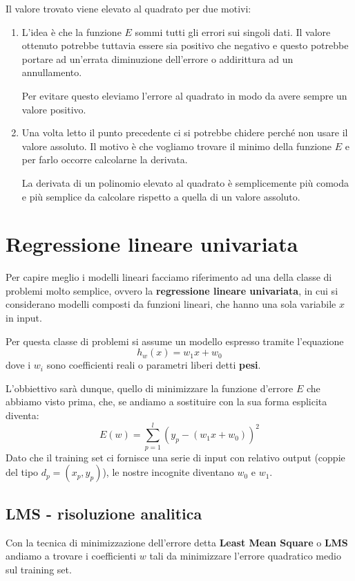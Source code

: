 Il valore trovato viene elevato al quadrato per due motivi:
\begin{enumerate}
	\item L'idea \`e che la funzione $E$ sommi tutti gli errori
        sui singoli dati. Il valore ottenuto potrebbe tuttavia 
        essere sia positivo che negativo e questo potrebbe
	      portare ad un'errata diminuzione dell'errore o addirittura ad un annullamento.

	      Per evitare questo eleviamo l'errore al quadrato in modo da avere sempre un valore
	      positivo.
	\item Una volta letto il punto precedente ci si potrebbe chidere perch\'e non usare il
	      valore assoluto. Il motivo \`e che vogliamo trovare il minimo della funzione $E$
	      e per farlo occorre calcolarne la derivata.

	      La derivata di un  polinomio elevato al quadrato \`e semplicemente pi\`u comoda
	      e pi\`u semplice da calcolare rispetto a quella di un valore assoluto.
\end{enumerate}

\section{Regressione lineare univariata}
Per capire meglio i modelli lineari facciamo riferimento ad una della classe di
problemi molto semplice, ovvero la \textbf{regressione lineare univariata}, in cui
si considerano modelli composti da funzioni lineari, che hanno una sola variabile $x$
in input.

Per questa classe di problemi si assume un modello espresso tramite l'equazione
\[ h_w(x) = w_1 x + w_0 \]
dove i $w_i$ sono coefficienti reali o parametri liberi detti \textbf{pesi}.

L'obbiettivo sar\`a dunque, quello di minimizzare la funzione d'errore $E$ che abbiamo visto
prima, che, se andiamo a sostituire con la sua forma esplicita diventa:
\[ E(w) = \sum_{p=1}^l (y_p - (w_1 x + w_0))^2 \]
Dato che il training set ci fornisce una serie di input con relativo output (coppie del
tipo $d_p = (x_p, y_p)$), le nostre incognite diventano $w_0$ e $w_1$.

\subsection{LMS - risoluzione analitica}
Con la tecnica di minimizzazione dell'errore detta \textbf{Least Mean Square} o \textbf{LMS}
andiamo a trovare i coefficienti $w$ tali da minimizzare l'errore quadratico medio sul
training set.

